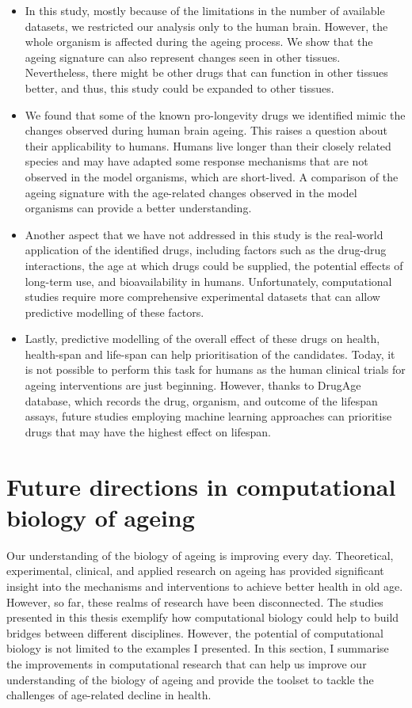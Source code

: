 \documentclass[12pt,twoside]{unicam}
\providecommand{\tightlist}{%
  \setlength{\itemsep}{0pt}\setlength{\parskip}{0pt}}
\begin{document}
\begin{itemize}
\tightlist
\item
  In this study, mostly because of the limitations in the number of available datasets, we restricted our analysis only to the human brain. However, the whole organism is affected during the ageing process. We show that the ageing signature can also represent changes seen in other tissues. Nevertheless, there might be other drugs that can function in other tissues better, and thus, this study could be expanded to other tissues.
\item
  We found that some of the known pro-longevity drugs we identified mimic the changes observed during human brain ageing. This raises a question about their applicability to humans. Humans live longer than their closely related species and may have adapted some response mechanisms that are not observed in the model organisms, which are short-lived. A comparison of the ageing signature with the age-related changes observed in the model organisms can provide a better understanding.
\item
  Another aspect that we have not addressed in this study is the real-world application of the identified drugs, including factors such as the drug-drug interactions, the age at which drugs could be supplied, the potential effects of long-term use, and bioavailability in humans. Unfortunately, computational studies require more comprehensive experimental datasets that can allow predictive modelling of these factors.
\item
  Lastly, predictive modelling of the overall effect of these drugs on health, health-span and life-span can help prioritisation of the candidates. Today, it is not possible to perform this task for humans as the human clinical trials for ageing interventions are just beginning. However, thanks to DrugAge database, which records the drug, organism, and outcome of the lifespan assays, future studies employing machine learning approaches can prioritise drugs that may have the highest effect on lifespan.
\end{itemize}

\hypertarget{future-directions-in-computational-biology-of-ageing}{%
\section{Future directions in computational biology of ageing}\label{future-directions-in-computational-biology-of-ageing}}

Our understanding of the biology of ageing is improving every day. Theoretical, experimental, clinical, and applied research on ageing has provided significant insight into the mechanisms and interventions to achieve better health in old age. However, so far, these realms of research have been disconnected. The studies presented in this thesis exemplify how computational biology could help to build bridges between different disciplines. However, the potential of computational biology is not limited to the examples I presented. In this section, I summarise the improvements in computational research that can help us improve our understanding of the biology of ageing and provide the toolset to tackle the challenges of age-related decline in health.
\end{document}
